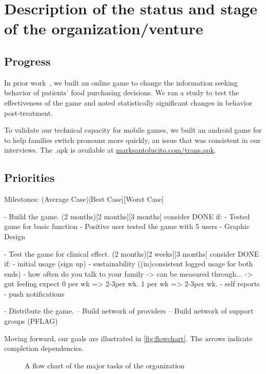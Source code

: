 \section{Description of the status and stage of the organization/venture}

\subsection{Progress}
In prior work~\cite{hwang2016}, we built an online game to change the information seeking behavior of patients' food purchasing decisions.
We ran a study to test the effectiveness of the game and noted statistically significant changes in behavior post-treatment.

To validate our technical capacity for mobile games, we built an android game for to help families switch pronouns more quickly, an issue that was consistent in our interviews. The .apk is available at \url{marksantolucito.com/trans.apk}. 


\subsection{Priorities}


Milestones: (Average Case)[Best Case][Worst Case]

- Build the game. (2 months)[2 months][3 months]
consider DONE if:
    - Tested game for basic function
    - Positive user tested the game with 5 users
    - Graphic Design

- Test the game for clinical effect. (2 months)[2 weeks][3 months]
consider DONE if:
    - initial usage (sign up)
    - sustainability ((in)consistent logged usage for both ends)
    - how often do you talk to your family
        -> can be measured through...
        -> gut feeling expect
         0 per wk => 2-3per wk.
         1 per wk => 2-3per wk.
    - self reports
    - push notifications
    
- Distribute the game.
-- Build network of providers
-- Build network of support groups (PFLAG)


Moving forward, our goals are illustrated in \autoref{fig:flowchart}.
The arrows indicate completion dependencies.
    
\begin{figure}[!h]
    \centering
    
    \caption{A flow chart of the major tasks of the organization}
    \label{fig:flowchart}
\end{figure}  


%
%

%

%